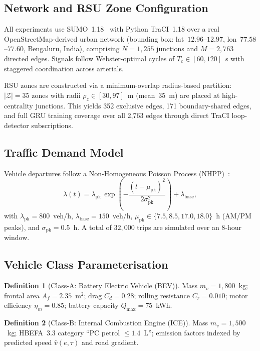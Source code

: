 \documentclass[journal,letterpaper,10pt]{IEEEtran}
\theoremstyle{definition}
\newtheorem{definition}{Definition}
\theoremstyle{remark}
\newcommand{\zones}{\mathcal{Z}}
\begin{document}
\subsection{Network and RSU Zone Configuration}

All experiments use \mbox{SUMO~1.18}~\cite{behrisch2011sumo} with
Python TraCI~1.18 over a real OpenStreetMap-derived urban network
(bounding box: lat~$12.96$--$12.97$, lon~$77.58$--$77.60$,
Bengaluru, India), comprising $N=1{,}255$ junctions and $M=2{,}763$
directed edges.  Signals follow Webster-optimal cycles of
$T_c\in[60,120]$~s with staggered coordination across arterials.

RSU zones are constructed via a minimum-overlap radius-based
partition: $|\zones|=35$ zones with radii
$\rho_z\in[30,97]$~m (mean~35~m) are placed at high-centrality
junctions.  This yields 352 exclusive edges, 171 boundary-shared
edges, and full GRU training coverage over all 2,763 edges through
direct TraCI loop-detector subscriptions.

\subsection{Traffic Demand Model}

Vehicle departures follow a Non-Homogeneous Poisson Process
(NHPP)~\cite{cox1955poisson}:
\begin{equation}
  \lambda(t)
  =
  \lambda_{\mathrm{pk}}\,
  \exp\!\left(
    -\frac{(t-\mu_{\mathrm{pk}})^2}{2\sigma_{\mathrm{pk}}^2}
  \right)
  +\lambda_{\mathrm{base}},
  \label{eq:nhpp}
\end{equation}
with $\lambda_{\mathrm{pk}}=800$~veh/h,
$\lambda_{\mathrm{base}}=150$~veh/h,
$\mu_{\mathrm{pk}}\in\{7.5,8.5,17.0,18.0\}$~h (AM/PM peaks), and
$\sigma_{\mathrm{pk}}=0.5$~h.  A total of $32{,}000$ trips are
simulated over an 8-hour window.

\subsection{Vehicle Class Parameterisation}

\begin{definition}[Class-A: Battery Electric Vehicle (BEV)]
Mass $m_v=1{,}800$~kg; frontal area $A_f=2.35$~m$^2$; drag
$C_d=0.28$; rolling resistance $C_r=0.010$; motor efficiency
$\eta_m=0.85$; battery capacity $Q_{\max}=75$~kWh.
\end{definition}

\begin{definition}[Class-B: Internal Combustion Engine (ICE)]
Mass $m_v=1{,}500$~kg; HBEFA~3.3 category
``PC petrol $\leq1.4$~L''; emission factors indexed by predicted
speed $\hat{v}(e,\tau)$ and road gradient.
\end{definition}
\end{document}
